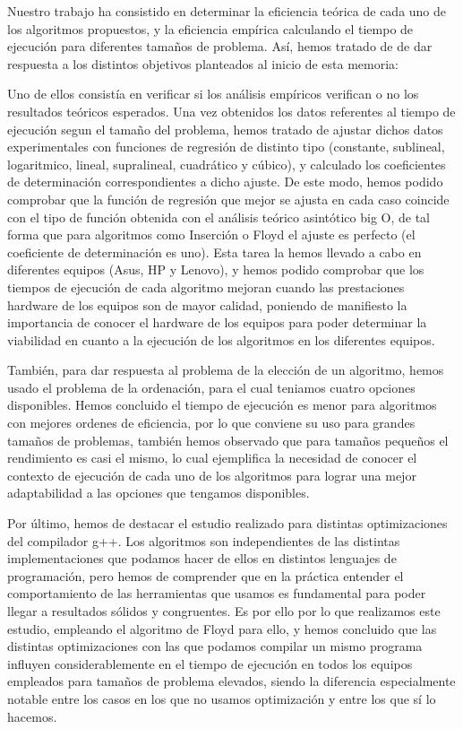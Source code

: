 \documentclass{homework}
\begin{document}
    Nuestro trabajo ha consistido en determinar la eficiencia teórica de cada uno de los algoritmos propuestos, y la eficiencia empírica calculando
    el tiempo de ejecución para diferentes tamaños de problema. Así, hemos tratado de de dar respuesta a los distintos objetivos planteados al inicio
    de esta memoria:

    Uno de ellos consistía en verificar si los análisis empíricos verifican o no los resultados teóricos esperados. Una vez obtenidos los datos 
    referentes al tiempo de ejecución segun el tamaño del problema, hemos tratado de ajustar dichos datos experimentales con funciones de regresión de 
    distinto tipo (constante, sublineal, logaritmico, lineal, supralineal, cuadrático y cúbico), y calculado los coeficientes de determinación correspondientes
    a dicho ajuste. De este modo, hemos podido comprobar que la función de regresión que mejor se ajusta en cada caso coincide con el tipo de función
    obtenida con el análisis teórico asintótico big O, de tal forma que para algoritmos como Inserción o Floyd el ajuste es perfecto (el coeficiente de 
    determinación es uno). Esta tarea la hemos llevado a cabo en diferentes equipos (Asus, HP y Lenovo), y hemos podido comprobar que los tiempos de 
    ejecución de cada algoritmo mejoran cuando las prestaciones hardware de los equipos son de mayor calidad, poniendo de manifiesto la importancia de conocer
    el hardware de los equipos para poder determinar la viabilidad en cuanto a la ejecución de los algoritmos en los diferentes equipos. 

    También, para dar respuesta al problema de la elección de un algoritmo, hemos usado el problema de la ordenación, para el cual teniamos cuatro 
    opciones disponibles. Hemos concluido el tiempo de ejecución es menor para algoritmos con mejores ordenes de eficiencia, por lo que conviene su 
    uso para grandes tamaños de problemas, también hemos observado que para tamaños pequeños el rendimiento es casi el mismo, lo cual ejemplifica la
    necesidad de conocer el contexto de ejecución de cada uno de los algoritmos para lograr una mejor adaptabilidad a las opciones que tengamos disponibles.
    
    Por último, hemos de destacar el estudio realizado para distintas optimizaciones del compilador g++. Los algoritmos son independientes de las distintas
    implementaciones que podamos hacer de ellos en distintos lenguajes de programación, pero hemos de comprender que en la práctica entender el comportamiento
    de las herramientas que usamos es fundamental para poder llegar a resultados sólidos y congruentes. Es por ello por lo que realizamos este estudio, empleando 
    el algoritmo de Floyd para ello, y hemos concluido que las distintas optimizaciones con las que podamos compilar un mismo programa influyen considerablemente en el tiempo de ejecución en todos los 
    equipos empleados para tamaños de problema elevados, siendo la diferencia especialmente notable entre los casos en los que no usamos optimización y entre los que sí lo hacemos.
    
\end{document}

